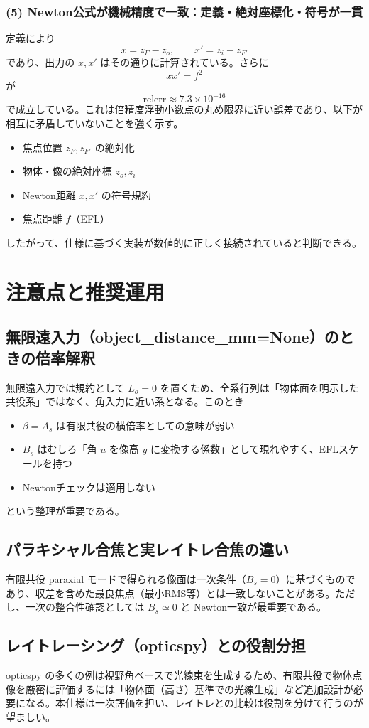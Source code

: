 \subsubsection*{(5) Newton公式が機械精度で一致：定義・絶対座標化・符号が一貫}
定義により
\[
x=z_F-z_o,\qquad x'=z_i-z_{F'}
\]
であり、出力の $x, x'$ はその通りに計算されている。さらに
\[
x x' = f^2
\]
が
\[
\mathrm{relerr}\approx 7.3\times 10^{-16}
\]
で成立している。これは倍精度浮動小数点の丸め限界に近い誤差であり、以下が相互に矛盾していないことを強く示す。
\begin{itemize}
  \item 焦点位置 $z_F, z_{F'}$ の絶対化
  \item 物体・像の絶対座標 $z_o, z_i$
  \item Newton距離 $x,x'$ の符号規約
  \item 焦点距離 $f$（EFL）
\end{itemize}
したがって、仕様に基づく実装が数値的に正しく接続されていると判断できる。

\section{注意点と推奨運用}

\subsection{無限遠入力（object\_distance\_mm=None）のときの倍率解釈}
無限遠入力では規約として $L_o=0$ を置くため、全系行列は「物体面を明示した共役系」ではなく、角入力に近い系となる。このとき
\begin{itemize}
  \item $\beta=A_s$ は有限共役の横倍率としての意味が弱い
  \item $B_s$ はむしろ「角 $u$ を像高 $y$ に変換する係数」として現れやすく、EFLスケールを持つ
  \item Newtonチェックは適用しない
\end{itemize}
という整理が重要である。

\subsection{パラキシャル合焦と実レイトレ合焦の違い}
有限共役 paraxial モードで得られる像面は一次条件（$B_s=0$）に基づくものであり、収差を含めた最良焦点（最小RMS等）とは一致しないことがある。ただし、一次の整合性確認としては $B_s\simeq 0$ と Newton一致が最重要である。

\subsection{レイトレーシング（opticspy）との役割分担}
opticspy の多くの例は視野角ベースで光線束を生成するため、有限共役で物体点像を厳密に評価するには「物体面（高さ）基準での光線生成」など追加設計が必要になる。本仕様は一次評価を担い、レイトレとの比較は役割を分けて行うのが望ましい。

